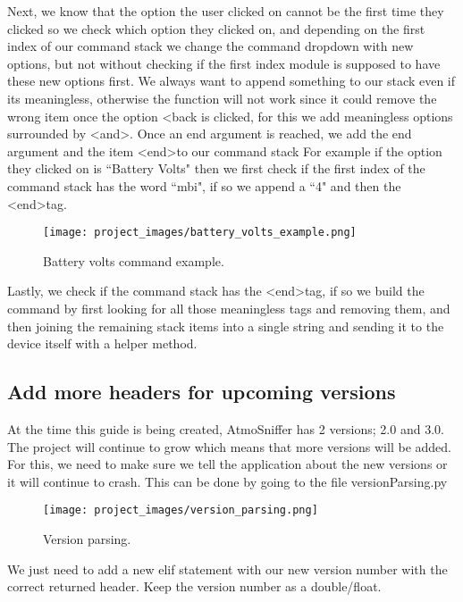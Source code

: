 	Next, we know that the option the user clicked on cannot be the first time they clicked so we check which option they clicked on, and depending on the first index of our command stack we change the command dropdown with new options, but not without checking if the first index module is supposed to have these new options first.
	We always want to append something to our stack even if its meaningless, otherwise the function will not work since it could remove the wrong item once the option \textless back is clicked, for this we add meaningless options surrounded by \textless and\textgreater.
	Once an end argument is reached, we add the end argument and the item \textless end\textgreater to our command stack
	For example if the option they clicked on is ``Battery Volts" then we first check if the first index of the command stack has the word ``mbi", if so we append a ``4" and then the \textless end\textgreater tag.

\begin{figure}[H]
\centering
\texttt{[image: project\_images/battery\_volts\_example.png]}
 \caption{Battery volts command example.}
 \label{fig:battery volts example}
\end{figure}
	
	Lastly, we check if the command stack has the \textless end\textgreater tag, if so we build the command by first looking for all those meaningless tags and removing them, and then joining the remaining stack items into a single string and sending it to the device itself with a helper method.

\subsection{Add more headers for upcoming versions}

	At the time this guide is being created, AtmoSniffer has 2 versions; 2.0 and 3.0. The project will continue to grow which means that more versions will be added.
	For this, we need to make sure we tell the application about the new versions or it will continue to crash. This can be done by going to the file versionParsing.py

\begin{figure}[H]
\centering
\texttt{[image: project\_images/version\_parsing.png]}
 \caption{Version parsing.}
 \label{fig:version parsing}
\end{figure}

We just need to add a new elif statement with our new version number with the correct returned header. Keep the version number as a double/float.

